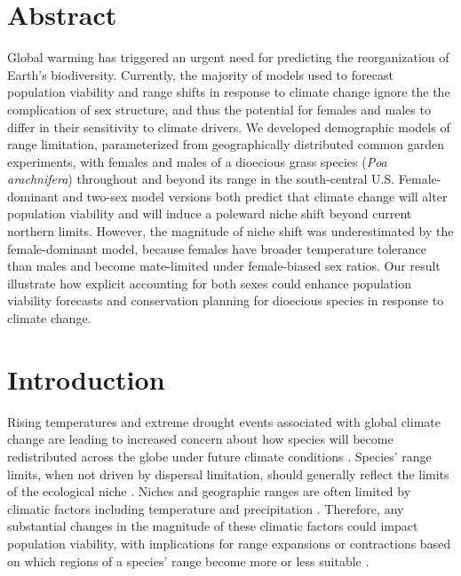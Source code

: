 \documentclass[12pt]{article}\usepackage[]{graphicx}\usepackage[dvipsnames]{xcolor}
\begin{document}
\section*{Abstract}
Global warming has triggered an urgent need for predicting the reorganization of Earth's biodiversity.
Currently, the  majority of models used to forecast population viability and range shifts in response to climate change ignore the the complication of sex structure, and thus the potential for females and males to differ in their sensitivity to climate drivers. 
We developed demographic models of range limitation, parameterized from geographically distributed common garden experiments, with females and males of a dioecious grass species (\textit{Poa arachnifera}) throughout and beyond its range in the south-central U.S. 
Female-dominant and two-sex model versions both predict that  climate change will alter population viability and will induce a poleward niche shift beyond current northern limits.
However, the magnitude of niche shift was underestimated by the female-dominant model, because females have broader temperature tolerance than males and become mate-limited under female-biased sex ratios.
Our result illustrate how explicit accounting for both sexes could enhance population viability forecasts and conservation planning for dioecious species in response to climate change.

\newpage
\section*{Introduction}
Rising temperatures and extreme drought events associated with global climate change are leading to increased concern about how species will become redistributed across the globe under future climate conditions \citep{bertrand2011changes,gamelon2017interactions,smith2024extreme}.
Species' range limits, when not driven by dispersal limitation, should generally reflect the limits of the ecological niche \citep{lee2016synthesis}.
Niches and geographic ranges are often limited by climatic factors including temperature and precipitation \citep{sexton2009evolution}. 
Therefore, any substantial changes in the magnitude of these climatic factors could impact population viability, with implications for range expansions or contractions based on which regions of a species' range become more or less suitable  \citep{davis2001range, pease1989model}. 
\end{document}

